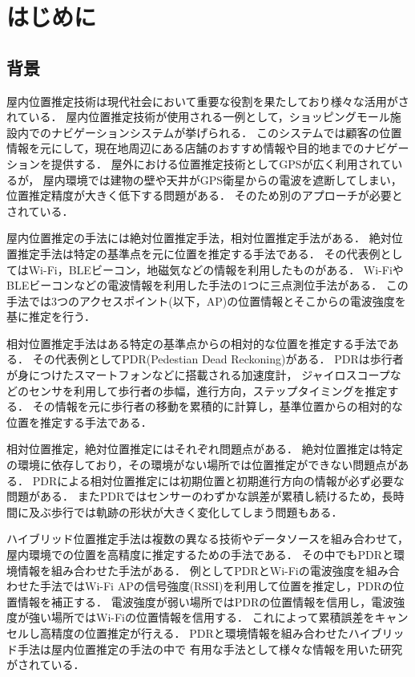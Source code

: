 \chapter{はじめに}
\thispagestyle{myheadings}


\section{背景}
屋内位置推定技術は現代社会において重要な役割を果たしており様々な活用がされている．
屋内位置推定技術が使用される一例として，ショッピングモール施設内でのナビゲーションシステムが挙げられる\cite{burasapo}．
このシステムでは顧客の位置情報を元にして，現在地周辺にある店舗のおすすめ情報や目的地までのナビゲーションを提供する．
屋外における位置推定技術としてGPSが広く利用されているが，
屋内環境では建物の壁や天井がGPS衛星からの電波を遮断してしまい，
位置推定精度が大きく低下する問題がある．
そのため別のアプローチが必要とされている．

屋内位置推定の手法には絶対位置推定手法，相対位置推定手法がある．
絶対位置推定手法は特定の基準点を元に位置を推定する手法である．
その代表例としてはWi-Fi，BLEビーコン，地磁気などの情報を利用したものがある．
Wi-FiやBLEビーコンなどの電波情報を利用した手法の1つに三点測位手法がある．
この手法では3つのアクセスポイント(以下，AP)の位置情報とそこからの電波強度を基に推定を行う．

相対位置推定手法はある特定の基準点からの相対的な位置を推定する手法である．
その代表例としてPDR(Pedestian Dead Reckoning)がある．
PDRは歩行者が身につけたスマートフォンなどに搭載される加速度計，
ジャイロスコープなどのセンサを利用して歩行者の歩幅，進行方向，ステップタイミングを推定する．
その情報を元に歩行者の移動を累積的に計算し，基準位置からの相対的な位置を推定する手法である．

相対位置推定，絶対位置推定にはそれぞれ問題点がある．
絶対位置推定は特定の環境に依存しており，その環境がない場所では位置推定ができない問題点がある．
PDRによる相対位置推定には初期位置と初期進行方向の情報が必ず必要な問題がある．
またPDRではセンサーのわずかな誤差が累積し続けるため，長時間に及ぶ歩行では軌跡の形状が大きく変化してしまう問題もある．

ハイブリッド位置推定手法は複数の異なる技術やデータソースを組み合わせて，
屋内環境での位置を高精度に推定するための手法である．
その中でもPDRと環境情報を組み合わせた手法がある．
例としてPDRとWi-Fiの電波強度を組み合わせた手法ではWi-Fi APの信号強度(RSSI)を利用して位置を推定し，PDRの位置情報を補正する．
電波強度が弱い場所ではPDRの位置情報を信用し，電波強度が強い場所ではWi-Fiの位置情報を信用する．
これによって累積誤差をキャンセルし高精度の位置推定が行える．
PDRと環境情報を組み合わせたハイブリッド手法は屋内位置推定の手法の中で
有用な手法として様々な情報を用いた研究がされている．

